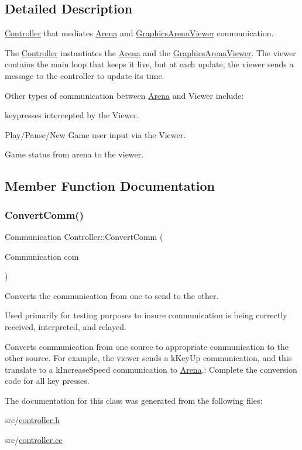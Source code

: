 \subsection{Detailed Description}
\mbox{\hyperlink{class_controller}{Controller}} that mediates \mbox{\hyperlink{class_arena}{Arena}} and \mbox{\hyperlink{class_graphics_arena_viewer}{Graphics\+Arena\+Viewer}} communication. 

The \mbox{\hyperlink{class_controller}{Controller}} instantiates the \mbox{\hyperlink{class_arena}{Arena}} and the \mbox{\hyperlink{class_graphics_arena_viewer}{Graphics\+Arena\+Viewer}}. The viewer contains the main loop that keeps it live, but at each update, the viewer sends a message to the controller to update its time.

Other types of communication between \mbox{\hyperlink{class_arena}{Arena}} and Viewer include\+:
\begin{DoxyItemize}
\item keypresses intercepted by the Viewer.
\item Play/\+Pause/\+New Game user input via the Viewer.
\item Game status from arena to the viewer. 
\end{DoxyItemize}

\subsection{Member Function Documentation}
\mbox{\label{class_controller_ae9b0504ab74cdacc654528b609074adc}} 
\subsubsection{\texorpdfstring{Convert\+Comm()}{ConvertComm()}}
{\footnotesize\ttfamily Communication Controller\+::\+Convert\+Comm (\begin{DoxyParamCaption}\item[{Communication}]{com }\end{DoxyParamCaption})}



Converts the communication from one to send to the other. 

Used primarily for testing purposes to insure communication is being correctly received, interpreted, and relayed.

Converts communication from one source to appropriate communication to the other source. For example, the viewer sends a k\+Key\+Up communication, and this translate to a k\+Increase\+Speed communication to \mbox{\hyperlink{class_arena}{Arena}}.\+: Complete the conversion code for all key presses. 

The documentation for this class was generated from the following files\+:\begin{DoxyCompactItemize}
\item 
src/\mbox{\hyperlink{controller_8h}{controller.\+h}}\item 
src/\mbox{\hyperlink{controller_8cc}{controller.\+cc}}\end{DoxyCompactItemize}
